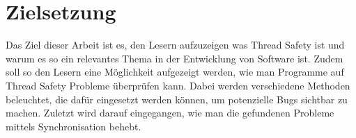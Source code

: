 \section{Zielsetzung}

Das Ziel dieser Arbeit ist es, den Lesern aufzuzeigen was Thread Safety ist und warum es so ein relevantes Thema in der Entwicklung von Software ist. Zudem soll so den Lesern eine Möglichkeit aufgezeigt werden, wie man Programme auf Thread Safety Probleme überprüfen kann. Dabei werden verschiedene Methoden beleuchtet, die dafür eingesetzt werden können, um potenzielle Bugs sichtbar zu machen. Zuletzt wird darauf eingegangen, wie man die gefundenen Probleme mittels Synchronisation behebt.